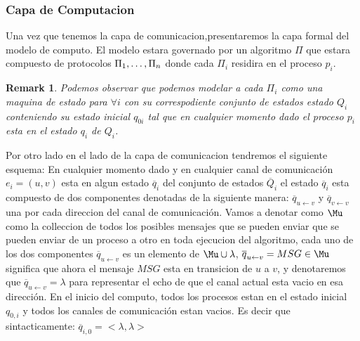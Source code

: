 \documentclass[10pt]{report}
\newtheorem*{remark}{Remark}
\begin{document}
    \subsubsection{Capa de Computacion}
    Una vez que tenemos la capa de comunicacion,presentaremos la capa formal del modelo de
    computo.
    El modelo estara governado por un algoritmo $\Pi$ que estara compuesto de protocolos
    $\Pi_{1},\mathellipsis,\Pi_{n}$ donde cada $\Pi_{i}$ residira en el proceso
    $p_{i}$.
    \begin{remark}
        Podemos observar que podemos modelar a cada $\Pi_{i}$ como una maquina de estado para $\forall i$ con su
        correspodiente conjunto de estados estado $Q_{i}$ conteniendo su estado inicial  $q_{0i}$ tal que en cualquier
        momento dado el proceso $p_{i}$ esta en el estado $q_{i}$ de $Q_{i}$.
    \end{remark}
    Por otro lado en el lado de la capa de comunicacion tendremos el siguiente esquema:
    En cualquier momento dado y en cualquier canal de comunicación $e_{i}=(u,v)$ esta en algun estado
    $\overline{q}_{i}$ del conjunto de estados $\overline{Q}_{i}$
    el estado $\overline{q}_{i}$ esta compuesto de dos componentes denotadas de la siguiente manera:
    $\overline{q}_{u\leftarrow v}$ y $\overline{q}_{v\leftarrow v}$ una por cada direccion del canal
    de comunicación.
    Vamos a denotar como $\Mu$ como la colleccion de todos los posibles mensajes que se pueden enviar
    que se pueden enviar de un proceso a otro en toda ejecucion del algoritmo,
    cada uno de los dos componentes $\overline{q}_{u \leftarrow v}$ es un elemento de $\Mu \cup \lambda$,
    $\overline{q}_{u\leftarrow v} = MSG\in \Mu$ significa que ahora el mensaje $MSG$ esta en transicion de
    $u$ a $v$, y denotaremos que $\overline{q}_{u\leftarrow v} = \lambda$ para representar el echo de que
    el canal actual esta vacio en esa dirección.
    En el inicio del computo, todos los procesos estan en el estado inicial $q_{0,i}$
    y todos los canales de comunicación estan vacios.
    Es decir que sintacticamente: $\overline{q}_{i,0}   = <\lambda,\lambda>$
\end{document}
